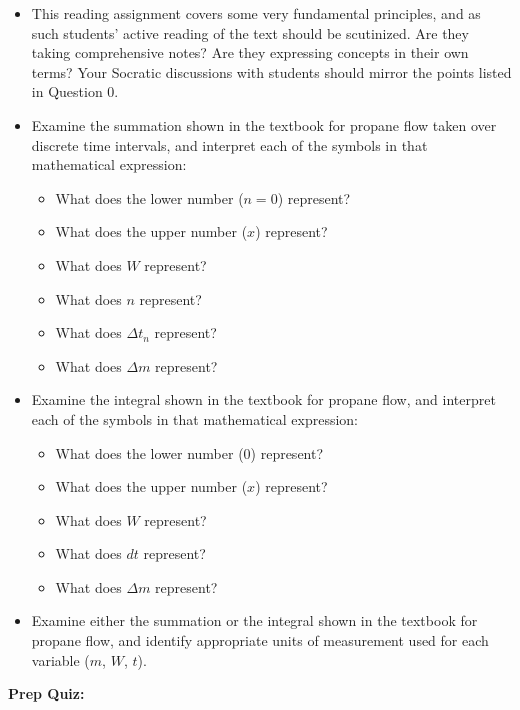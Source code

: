 \begin{itemize}
\item{} This reading assignment covers some very fundamental principles, and as such students' active reading of the text should be scutinized.  Are they taking comprehensive notes?  Are they expressing concepts in their own terms?  Your Socratic discussions with students should mirror the points listed in Question 0.
\item{} Examine the summation shown in the textbook for propane flow taken over discrete time intervals, and interpret each of the symbols in that mathematical expression:  
\begin{itemize}

\item{} What does the lower number ($n = 0$) represent?
\item{} What does the upper number ($x$) represent?
\item{} What does $W$ represent?
\item{} What does $n$ represent?
\item{} What does $\Delta t_n$ represent?
\item{} What does $\Delta m$ represent?
\end{itemize}
\item{} Examine the integral shown in the textbook for propane flow, and interpret each of the symbols in that mathematical expression:  
\begin{itemize}

\item{} What does the lower number (0) represent?
\item{} What does the upper number ($x$) represent?
\item{} What does $W$ represent?
\item{} What does $dt$ represent?
\item{} What does $\Delta m$ represent?
\end{itemize}
\item{} Examine either the summation or the integral shown in the textbook for propane flow, and identify appropriate units of measurement used for each variable ($m$, $W$, $t$).
\end{itemize}










\vfil \eject

\noindent
{\bf Prep Quiz:}

